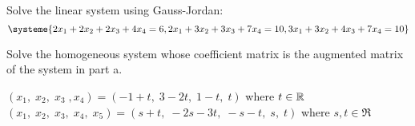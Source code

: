 

\begin{Exercise}[name={},
title={}, 
origin={\cite{AG}},
counter=Exercise]
\Question Solve the linear system using Gauss-Jordan:
$$
\systeme{
2x_1+  2x_2+  2x_3+  4x_4=6,
2x_1+  3x_2+  3x_3+  7x_4=10,
3x_1+ 3x_2 +4x_3+7x_4=10
}
$$

\Question Solve the homogeneous system whose coefficient matrix is the augmented matrix of the system in part a.


\end{Exercise}
\begin{Answer}
\Question $(x_1,\;x_2,\;x_3\;,x_4)=(-1+t,\;3-2t,\;1-t,\;t)$ where $t\in\mathbb{R}$ 
\Question $(x_1,\;x_2,\;x_3,\;x_4,\;x_5)=(s+t,\;-2s-3t,\;-s-t,\;s,\;t)$ where $s,t\in\Re$
\end{Answer}

